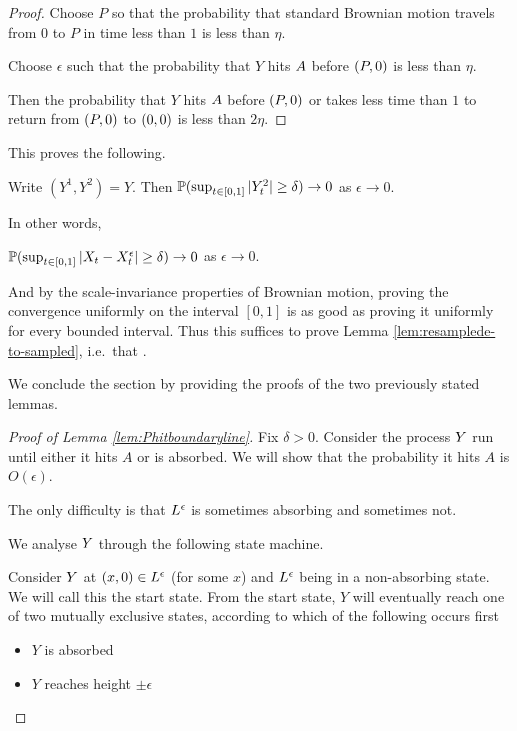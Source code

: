 {\begin{proof}
  Choose $P$ so that the probability that standard Brownian motion
  travels from $0$ to $P$ in time less than $1$ is less than
  $\eta$.

  Choose $\epsilon$ such that the probability that $Y$ hits
  $\boundarylines$ before $\farpoint$ is less than $\eta$.

  Then the probability that $Y$ hits $\boundarylines$ before $\farpoint$
  or takes less time than $1$ to return from $\farpoint$ to $\origin$ is
  less than $2\eta$.
\end{proof}

This proves the following.

\begin{lemma}
  Write $(Y^1, Y^2) = Y$.  Then $\P(\sup_{t \in [0,1]} |Y^2_t| \ge
  \delta) \to 0$ as $\epsilon \to 0$.
\end{lemma}

In other words,

\begin{cor}
  $\P(\sup_{t \in [0,1]} |\sampled_t - \resamplede_t | \ge \delta) \to
  0$ as $\epsilon \to 0$.
\end{cor}

And by the scale-invariance properties of Brownian motion, proving the
convergence uniformly on the interval $[0,1]$ is as good as proving it
uniformly for every bounded interval.  Thus this suffices to prove
Lemma \ref{lem:resamplede-to-sampled}, i.e.\ that \statementoflemresampledetosampled.

We conclude the section by providing the proofs of the two previously
stated lemmas.

\begin{proof}[Proof of Lemma \ref{lem:Phitboundaryline}]
Fix $\delta > 0$.  Consider the process $\rotproc$ run until either
it hits $A$ or is absorbed.  We will show that the probability it
hits $A$ is $O(\epsilon)$.

The only difficulty is that $\Le$ is sometimes absorbing and
sometimes not.

We analyse $\rotproc$ through the following state machine.

Consider $\rotproc$ at $(x,0) \in \Le$ (for some $x$) and $\Le$ being in
a non-absorbing state.  We will call this the start state.  From the
start state, $Y$ will eventually reach one of two mutually exclusive
states, according to which of the following occurs first

\newcommand{\intermediatelines}{I}

\begin{itemize}
\item $Y$ is absorbed
\item $Y$ reaches height $\pm\epsilon$
\end{itemize}


\end{proof}}
